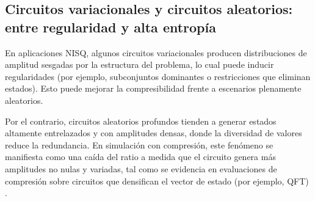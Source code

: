 \subsection{Circuitos variacionales y circuitos aleatorios: entre regularidad y alta entropía}
\label{subsec:patrones_variacionales_aleatorios}

En aplicaciones NISQ, algunos circuitos variacionales producen distribuciones de amplitud sesgadas por la estructura del problema, lo cual puede inducir regularidades (por ejemplo, subconjuntos dominantes o restricciones que eliminan estados). Esto puede mejorar la compresibilidad frente a escenarios plenamente aleatorios.

Por el contrario, circuitos aleatorios profundos tienden a generar estados altamente entrelazados y con amplitudes densas, donde la diversidad de valores reduce la redundancia. En simulación con compresión, este fenómeno se manifiesta como una caída del ratio a medida que el circuito genera más amplitudes no nulas y variadas, tal como se evidencia en evaluaciones de compresión sobre circuitos que densifican el vector de estado (por ejemplo, QFT) \cite{wu2018amplitude}.
